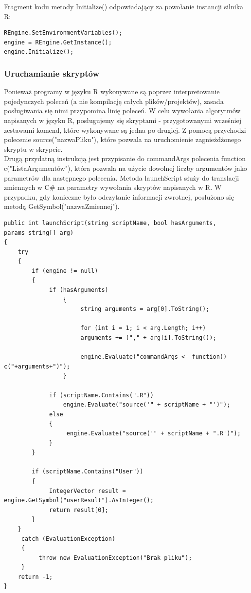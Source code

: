 \documentclass[a4paper,twoside]{article}
\begin{document}
\newpage

Fragment kodu metody Initialize() odpowiadający za powołanie instancji silnika R:
\lstset{style=sharpc}
\begin{lstlisting}[language=CSharp]
REngine.SetEnvironmentVariables();
engine = REngine.GetInstance();
engine.Initialize();
\end{lstlisting}

\subsubsection{Uruchamianie skryptów}

Ponieważ programy w języku R wykonywane są poprzez interpretowanie pojedynczych poleceń (a nie kompilację całych plików/projektów), zasada posługiwania się nimi przypomina linię poleceń. W celu wywołania algorytmów napisanych w języku R, posługujemy się skryptami - przygotowanymi wcześniej zestawami komend, które wykonywane są jedna po drugiej. Z pomocą przychodzi polecenie source("nazwaPliku"), które pozwala na uruchomienie zagnieżdżonego skryptu w skrypcie. \\

Drugą przydatną instrukcją jest przypisanie do commandArgs polecenia function c("ListaArgumentów"), która pozwala na użycie dowolnej liczby argumentów jako parametrów dla następnego polecenia. Metoda launchScript służy do translacji zmiennych w C\# na parametry wywołania skryptów napisanych w R. W przypadku, gdy konieczne było odczytanie informacji zwrotnej, posłużono się metodą GetSymbol("nazwaZmiennej").

\lstset{style=sharpc}
\begin{lstlisting}
public int launchScript(string scriptName, bool hasArguments,
params string[] arg)
{
	try
	{
	    if (engine != null)
	    {
		     if (hasArguments)
			     {
				      string arguments = arg[0].ToString();

				      for (int i = 1; i < arg.Length; i++)
				      arguments += ("," + arg[i].ToString());

				      engine.Evaluate("commandArgs <- function() c("+arguments+")");                        
			     }

		     if (scriptName.Contains(".R"))
			     engine.Evaluate("source('" + scriptName + "')");
		     else
		     {
			      engine.Evaluate("source('" + scriptName + ".R')");
		     }
	    }

	    if (scriptName.Contains("User"))
	    {
		     IntegerVector result = engine.GetSymbol("userResult").AsInteger();
		     return result[0];
	    }
	}
	 catch (EvaluationException)
	 {
		  throw new EvaluationException("Brak pliku");
	 }
	return -1;
}
\end{lstlisting}
\end{document}
